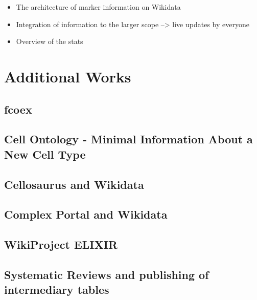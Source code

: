 \begin{itemize}
\tightlist
\item
  The architecture of marker information on Wikidata
\item
  Integration of information to the larger scope --\textgreater{} live updates by everyone
\item
  Overview of the stats
\end{itemize}

\hypertarget{additional-works}{%
\section{Additional Works}\label{additional-works}}

\hypertarget{fcoex}{%
\subsection{fcoex}\label{fcoex}}

\hypertarget{cell-ontology---minimal-information-about-a-new-cell-type}{%
\subsection{Cell Ontology - Minimal Information About a New Cell Type}\label{cell-ontology---minimal-information-about-a-new-cell-type}}

\hypertarget{cellosaurus-and-wikidata}{%
\subsection{Cellosaurus and Wikidata}\label{cellosaurus-and-wikidata}}

\hypertarget{complex-portal-and-wikidata}{%
\subsection{Complex Portal and Wikidata}\label{complex-portal-and-wikidata}}

\hypertarget{wikiproject-elixir}{%
\subsection{WikiProject ELIXIR}\label{wikiproject-elixir}}

\hypertarget{systematic-reviews-and-publishing-of-intermediary-tables}{%
\subsection{Systematic Reviews and publishing of intermediary tables}\label{systematic-reviews-and-publishing-of-intermediary-tables}}

